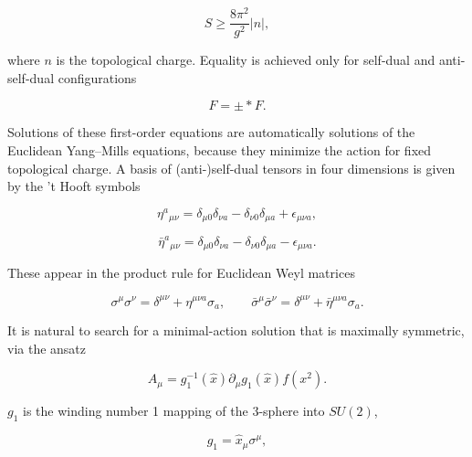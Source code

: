 \[
  S\geq\frac{8\pi^2}{g^2}|n|,
\]

where $n$ is the topological charge. Equality is achieved only for self-dual
and anti-self-dual configurations

\begin{equation}
  F=\pm\ast F.
  \label{eq:10.12}
\end{equation}

Solutions of these first-order equations are automatically solutions of the
Euclidean Yang--Mills equations, because they minimize the action for fixed
topological charge. A basis of (anti-)self-dual tensors in four dimensions is
given by the 't Hooft symbols

\begin{equation}
  \eta^a{}_{\mu\nu}=\delta_{\mu0}\delta_{\nu a}
  -\delta_{\nu0}\delta_{\mu a}+\epsilon_{\mu\nu a},
  \label{eq:10.13}
\end{equation}

\begin{equation}
  \bar\eta^a{}_{\mu\nu}=\delta_{\mu0}\delta_{\nu a}
  -\delta_{\nu0}\delta_{\mu a}-\epsilon_{\mu\nu a}.
  \label{eq:10.14}
\end{equation}

These appear in the product rule for Euclidean Weyl matrices

\begin{equation}
  \sigma^\mu\sigma^\nu=\delta^{\mu\nu}+\eta^{\mu\nu a}\sigma_a,
  \qquad
  \bar\sigma^\mu\bar\sigma^\nu=\delta^{\mu\nu}
  +\bar\eta^{\mu\nu a}\sigma_a.
  \label{eq:10.15}
\end{equation}

It is natural to search for a minimal-action solution that is maximally
symmetric, via the ansatz

\begin{equation}
  A_\mu=g_1^{-1}(\hat x)\partial_\mu g_1(\hat x)f(x^2).
  \label{eq:10.16}
\end{equation}

$g_1$ is the winding number 1 mapping of the 3-sphere into $SU(2)$,

\begin{equation}
  g_1=\hat x_\mu\sigma^\mu,
  \label{eq:10.17}
\end{equation}

